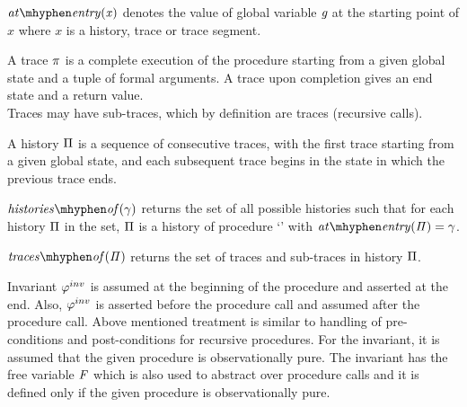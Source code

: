 
\begin{definition} 
  $\\\atEntry{x}$ denotes the value of global variable $\textit{g}$ at the
  starting point of $x$ where $x$ is a history, trace or trace
  segment.
\end{definition}

\begin{definition}[trace]
  A trace $\pi$ is a complete execution of the procedure starting
  from a given global state and a tuple of formal arguments. A trace
  upon completion gives an end state and a return value.\\ Traces may
  have sub-traces, which by definition are traces (recursive calls).
\end{definition}

\begin{definition}[history]
  A history $\Pi$ is a sequence of consecutive traces, with the
  first trace starting from a given global state, and each subsequent
  trace begins in the state in which the previous trace ends.
\end{definition}

\begin{definition} 
  $\historyOf{\gstate}$ returns the set of all possible histories such
  that for each history $\Pi$ in the set, $\Pi$ is a history
  of procedure `\foo' with $\atEntry{\history} = \gstate$.
\end{definition}

\begin{definition} $\tracesOf{\history}$ returns the set of traces and
  sub-traces in history $\Pi$.
\end{definition}

Invariant $\varphi^{inv}$ is assumed at the beginning of the procedure and
asserted at the end. Also, $\varphi^{inv}$ is asserted before the procedure
call and assumed after the procedure call. Above mentioned treatment
is similar to handling of pre-conditions and post-conditions for
recursive procedures. For the invariant, it is assumed that the given
procedure is observationally pure. The invariant has the free variable
$\mathit{F}$ which is also used to abstract over procedure calls and it is
defined only if the given procedure is observationally pure.

